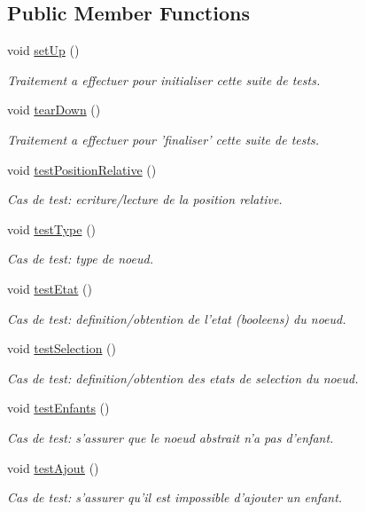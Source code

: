 \subsection*{Public Member Functions}
\begin{DoxyCompactItemize}
\item 
void \hyperlink{group__inf2990_ga4d2fe388f550ba374823d09b5c8ebe77}{set\-Up} ()
\begin{DoxyCompactList}\small\item\em Traitement a effectuer pour initialiser cette suite de tests. \end{DoxyCompactList}\item 
void \hyperlink{group__inf2990_ga2c5c558ff7e40386c724a55b670af417}{tear\-Down} ()
\begin{DoxyCompactList}\small\item\em Traitement a effectuer pour 'finaliser' cette suite de tests. \end{DoxyCompactList}\item 
void \hyperlink{group__inf2990_gaed7a5423d2a3a7518aef743f17d32ccd}{test\-Position\-Relative} ()
\begin{DoxyCompactList}\small\item\em Cas de test\-: ecriture/lecture de la position relative. \end{DoxyCompactList}\item 
void \hyperlink{group__inf2990_gadf554a62266cc21c7c48f6a27ad7c752}{test\-Type} ()
\begin{DoxyCompactList}\small\item\em Cas de test\-: type de noeud. \end{DoxyCompactList}\item 
void \hyperlink{group__inf2990_ga3def02e7ab244d09d1ffc231c47818b2}{test\-Etat} ()
\begin{DoxyCompactList}\small\item\em Cas de test\-: definition/obtention de l'etat (booleens) du noeud. \end{DoxyCompactList}\item 
void \hyperlink{group__inf2990_gac044744b04574c86418a57b39e3238ff}{test\-Selection} ()
\begin{DoxyCompactList}\small\item\em Cas de test\-: definition/obtention des etats de selection du noeud. \end{DoxyCompactList}\item 
void \hyperlink{group__inf2990_ga0e65b00620e79646a9efd8a93c4fc650}{test\-Enfants} ()
\begin{DoxyCompactList}\small\item\em Cas de test\-: s'assurer que le noeud abstrait n'a pas d'enfant. \end{DoxyCompactList}\item 
void \hyperlink{group__inf2990_ga0c8ab22a0e11160d54a82529dcbd41d5}{test\-Ajout} ()
\begin{DoxyCompactList}\small\item\em Cas de test\-: s'assurer qu'il est impossible d'ajouter un enfant. \end{DoxyCompactList}\end{DoxyCompactItemize}


